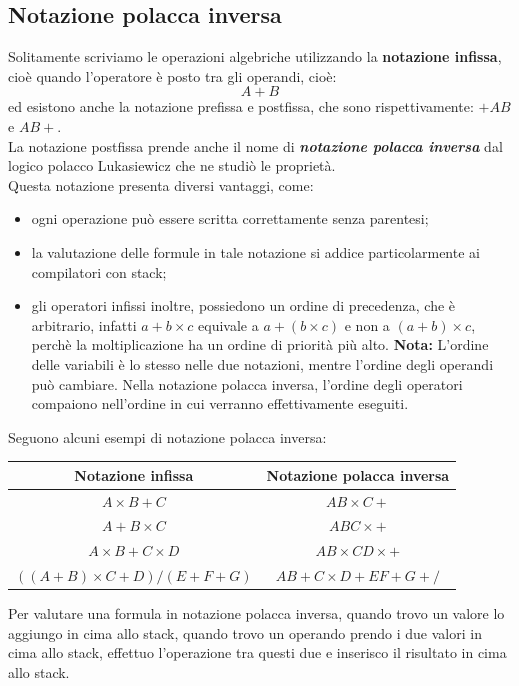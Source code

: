 \documentclass[12pt]{report}
\begin{document}
		\subsection{Notazione polacca inversa}
		Solitamente scriviamo le operazioni algebriche utilizzando la \textbf{notazione infissa}, cioè quando l'operatore è posto tra gli operandi, cioè:
		\[
		A + B
		\]
		ed esistono anche la notazione prefissa e postfissa, che sono rispettivamente: $+AB$ e $AB+$. \\
		La notazione postfissa prende anche il nome di \textbf{\textit{notazione polacca inversa}} dal logico polacco Lukasiewicz che ne studiò le proprietà. \\
		Questa notazione presenta diversi vantaggi, come:
		\begin{itemize}
			\item ogni operazione può essere scritta correttamente senza parentesi;
			\item la valutazione delle formule in tale notazione si addice particolarmente ai compilatori con stack;
			\item gli operatori infissi inoltre, possiedono un ordine di precedenza, che è arbitrario, infatti $a + b \times c$ equivale a $a + (b \times c)$ e non a $(a + b) \times c$, perchè la moltiplicazione ha un ordine di priorità più alto.
			\textbf{Nota:} L'ordine delle variabili	è lo stesso nelle due notazioni, mentre l'ordine degli operandi può cambiare. Nella notazione polacca inversa, l'ordine degli operatori compaiono nell'ordine in cui verranno effettivamente eseguiti.
		\end{itemize}
		Seguono alcuni esempi di notazione polacca inversa:
		\begin{center}
			\begin{tabular}{c | c}
				\textbf{Notazione infissa} & \textbf{Notazione polacca inversa} \\
				\hline
				$A \times B + C$ & $AB\times C + $ \\
				\hline
				$A + B \times C$ & $ABC\times +$ \\
				\hline
				$A \times B + C \times D$ & $AB\times CD \times +$ \\
				\hline
				$((A + B) \times C + D) / (E + F + G)$ & $AB+C\times D+ EF+G+ /$
			\end{tabular}
		\end{center}
		Per valutare una formula in notazione polacca inversa, quando trovo un valore lo aggiungo in cima allo stack, quando trovo un operando prendo i due valori in cima allo stack, effettuo l'operazione tra questi due e inserisco il risultato in cima allo stack.\\
\end{document}
